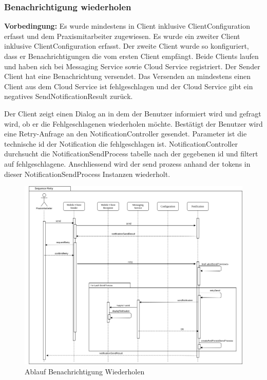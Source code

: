 \clearpage
\subsubsection*{Benachrichtigung wiederholen}

\textbf{Vorbedingung:} Es wurde mindestens in Client inklusive ClientConfiguration erfasst und dem Praxismitarbeiter zugewiesen.
Es wurde ein zweiter Client inklusive ClientConfiguration erfasst.
Der zweite Client wurde so konfiguriert, dass er Benachrichtigungen die vom ersten Client empfängt.
Beide Clients laufen und haben sich bei Messaging Service sowie Cloud Service registriert.
Der Sender Client hat eine Benachrichtung versendet.
Das Versenden an mindestens einen Client aus dem Cloud Service ist fehlgeschlagen und der Cloud Service gibt ein negatives SendNotificationResult zurück.


Der Client zeigt einen Dialog an in dem der Benutzer informiert wird und gefragt wird, ob er die Fehlgeschlagenen wiederholen möchte.
Bestätigt der Benutzer wird eine Retry-Anfrage an den NotificationController gesendet.
Parameter ist die technische id der Notification die fehlgeschlagen ist.
NotificationController durchsucht die NotificationSendProcess tabelle nach der gegebenen id und filtert auf fehlgeschlagene.
Anschliessend wird der send prozess anhand der tokens in dieser NotificationSendProcess Instanzen wiederholt.

\begin{figure}[h]
    \centering
    \begin{minipage}[b]{0.9\textwidth}
        \includegraphics[width=\textwidth]{graphics/Sequence_Notification_Retry}
        \caption{Ablauf Benachrichtigung Wiederholen}
    \end{minipage}
\end{figure}


